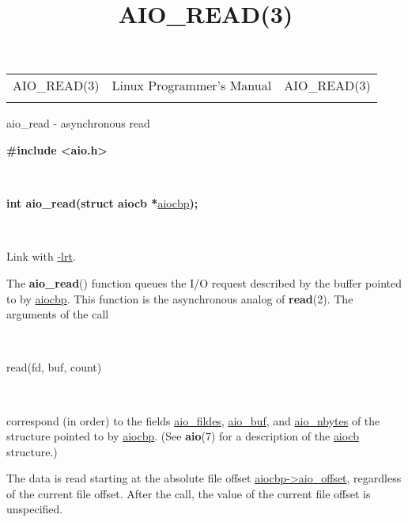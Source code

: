 \documentclass[]{article}
\title{AIO\_READ(3)}
\author{}
\date{}
\let\realtextbf=\textbf
\renewcommand{\textbf}[1]{\textcolor{boldcolor}{\realtextbf{#1}}}
\renewcommand{\emph}[1]{\underline{#1}}
\begin{document}
\maketitle

\begin{longtable}[c]{@{}lll@{}}
\toprule\addlinespace
AIO\_READ(3) & Linux Programmer's Manual & AIO\_READ(3)
\\\addlinespace
\bottomrule
\end{longtable}


aio\_read - asynchronous read


\textbf{\#include \textless{}aio.h\textgreater{}}

~

\textbf{int aio\_read(struct aiocb *}\emph{aiocbp}\textbf{);}

~

Link with \emph{-lrt}.


The \textbf{aio\_read}() function queues the I/O request described by
the buffer pointed to by \emph{aiocbp}. This function is the
asynchronous analog of \textbf{read}(2). The arguments of the call

~

read(fd, buf, count)

~

correspond (in order) to the fields \emph{aio\_fildes}, \emph{aio\_buf},
and \emph{aio\_nbytes} of the structure pointed to by \emph{aiocbp}.
(See \textbf{aio}(7) for a description of the \emph{aiocb} structure.)

The data is read starting at the absolute file offset
\emph{aiocbp-\textgreater{}aio\_offset}, regardless of the current file
offset. After the call, the value of the current file offset is
unspecified.
\end{document}

